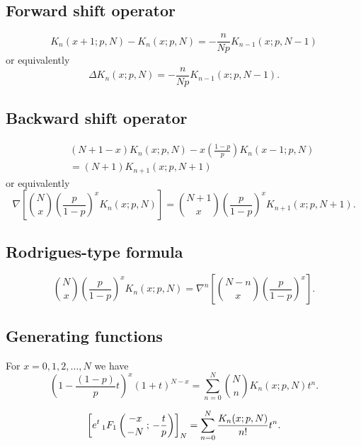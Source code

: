\documentclass[envcountchap,graybox]{svmono}
\newcommand{\hyp}[5]{\mbox{}_{#1}{F}_{#2}
\left(\genfrac{}{}{0pt}{}{#3}{#4}\,;\,#5\right)}
\begin{document}
\subsection*{Forward shift operator}
\begin{equation}
\label{shift1KrawtchoukI}
K_n(x+1;p,N)-K_n(x;p,N)=-\frac{n}{Np}K_{n-1}(x;p,N-1)
\end{equation}
or equivalently
\begin{equation}
\label{shift1KrawtchoukII}
\Delta K_n(x;p,N)=-\frac{n}{Np}K_{n-1}(x;p,N-1).
\end{equation}

\subsection*{Backward shift operator}
\begin{eqnarray}
\label{shift2KrawtchoukI}
& &(N+1-x)K_n(x;p,N)-x\left(\frac{1-p}{p}\right)K_n(x-1;p,N)\nonumber\\
& &{}=(N+1)K_{n+1}(x;p,N+1)
\end{eqnarray}
or equivalently
\begin{equation}
\label{shift2KrawtchoukII}
\nabla\left[\binom{N}{x}\left(\frac{p}{1-p}\right)^xK_n(x;p,N)\right]=
\binom{N+1}{x}\left(\frac{p}{1-p}\right)^xK_{n+1}(x;p,N+1).
\end{equation}

\subsection*{Rodrigues-type formula}
\begin{equation}
\label{RodKrawtchouk}
\binom{N}{x}\left(\frac{p}{1-p}\right)^xK_n(x;p,N)=
\nabla^n\left[\binom{N-n}{x}\left(\frac{p}{1-p}\right)^x\right].
\end{equation}

\subsection*{Generating functions}
For $x=0,1,2,\ldots,N$ we have
\begin{equation}
\label{GenKrawtchouk1}
\left(1-\frac{(1-p)}{p}t\right)^x(1+t)^{N-x}=
\sum_{n=0}^N\binom{N}{n}K_n(x;p,N)t^n.
\end{equation}

\begin{equation}
\label{GenKrawtchouk2}
\left[\expe^t\,\hyp{1}{1}{-x}{-N}{-\frac{t}{p}}\right]_N=
\sum_{n=0}^N\frac{K_n(x;p,N)}{n!}t^n.
\end{equation}
\end{document}

